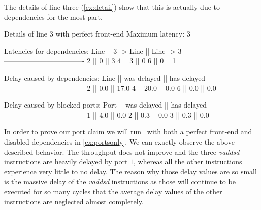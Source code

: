 The details of line three (\autoref{ex:detail}) show that this is actually due to dependencies for the most part.

\begin{LabeledExample}{Details of line $3$ with perfect front-end}{\label{ex:detail}}
                                        Maximum latency: 3
                                        
                                        Latencies for dependencies:
                                         Line || 3 -> Line || Line -> 3
                                        ----------------------------------
                                          2   ||     0     ||     3
                                          4   ||     3     ||     0
                                          6   ||     0     ||     1
                                        
                                        
                                        Delay caused by dependencies:
                                         Line || was delayed || has delayed
                                        ----------------------------------
                                          2   ||     0.0     ||    17.0
                                          4   ||    20.0     ||     0.0
                                          6   ||     0.0     ||     0.0
                                        
                                        
                                        Delay caused by blocked ports:
                                         Port || was delayed || has delayed
                                        ----------------------------------
                                          1   ||     4.0     ||     0.0
                                          2   ||     0.3     ||     0.0
                                          3   ||     0.3     ||     0.0
\end{LabeledExample}

In order to prove our port claim we will run \suaca\ with both a perfect front-end and disabled dependencies in \autoref{ex:portsonly}. We can exactly observe the above described behavior. The throughput does not improve and the three \emph{vaddsd} instructions are heavily delayed by port $1$, whereas all the other instructions experience very little to no delay. The reason why those delay values are so small is the massive delay of the \emph{vaddsd} instructions as those will continue to be executed for so many cycles that the average delay values of the other instructions are neglected almost completely.


